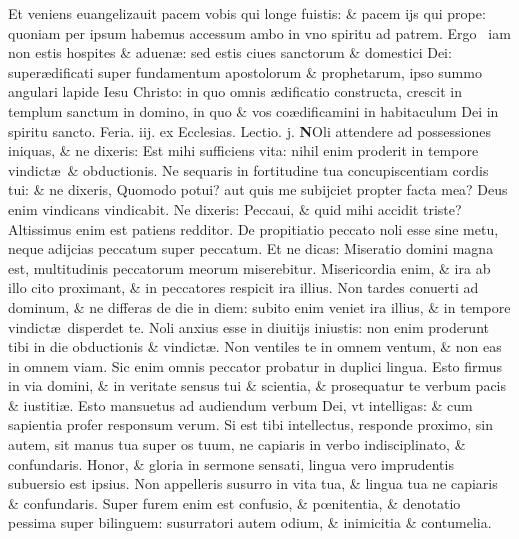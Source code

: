 \documentclass[a5paper,10pt]{book}
\def\leftmarginnote{%
	\lrmarginnote{\hskip -\marginparsep \hskip -6.5em}}
\def\ae{æ}
\def\oe{œ}
\begin{document}
\begin{multicols*}{2}
Et veniens euangelizauit pacem vobis qui longe fuistis: \& pacem ijs qui prope: quoniam per ipsum habemus accessum ambo in vno spiritu ad patrem. Ergo \textdagger \ 
iam\leftmarginnote{\begin{flushright}D\end{flushright}} non estis hospites \& aduen\ae : sed estis ciues sanctorum \& domestici Dei: super\ae dificati super fundamentum apostolorum \& prophetarum, ipso summo angulari lapide Iesu Christo: in quo omnis \ae dificatio constructa, crescit in templum sanctum in domino, in quo \& vos co\ae dificamini in habitaculum Dei in spiritu sancto.
\newline \textswab{C} \color{red} \hypertarget{TUE-SECVNDA-VAGAN}{Feria. iij.} ex Ecclesias. Lectio. j. \color{black}
\bookmark[dest=TUE-SECVNDA-VAGAN]{FERIA TERTIA}
\vspace{-.25em}
\lettrine[lines=2]{\bfseries N}{}Oli\leftmarginnote{\begin{flushright}ca. 5.\end{flushright}} attendere ad possessiones iniquas, \& ne dixeris: Est mihi sufficiens vita: nihil enim proderit in tempore vindict\ae \ \& obductionis.
Ne sequaris in fortitudine tua concupiscentiam cordis tui: \& ne dixeris, Quomodo potui? aut quis me
subijciet propter facta mea?
Deus enim vindicans vindicabit. Ne dixeris: Peccaui, \& quid mihi accidit triste? Altissimus enim est patiens redditor.
De propitiatio peccato noli esse sine metu, neque adijcias peccatum super peccatum.
Et ne dicas: Miseratio domini magna est, multitudinis peccatorum meorum miserebitur. Misericordia enim, \& ira ab illo cito proximant, \& in peccatores respicit ira illius.
Non tardes conuerti ad dominum, \& ne differas de die in diem: subito enim veniet ira illius, \& in tempore vindict\ae \ disperdet te.
Noli anxius esse in diuitijs iniustis: non enim proderunt tibi in die obductionis \& vindict\ae .
Non ventiles te in omnem ventum, \& non eas in omnem viam. Sic enim omnis peccator probatur in duplici lingua. Esto firmus in via domini, \& in veritate sensus tui \& scientia, \& prosequatur te verbum pacis \& iustiti\ae .
Esto mansuetus ad audiendum verbum Dei, vt intelligas: \& cum sapientia profer responsum verum. Si est tibi intellectus, responde proximo, sin autem, sit manus tua super os tuum, ne capiaris in verbo indisciplinato, \& confundaris.
Honor, \& gloria in sermone sensati, lingua vero imprudentis subuersio est ipsius.
Non appelleris susurro in vita tua, \& lingua tua ne capiaris \& confundaris. Super furem enim est confusio, \& p\oe nitentia, \& denotatio pessima super bilinguem: susurratori autem odium, \& inimicitia \& contumelia.

\end{multicols*}
\end{document}
